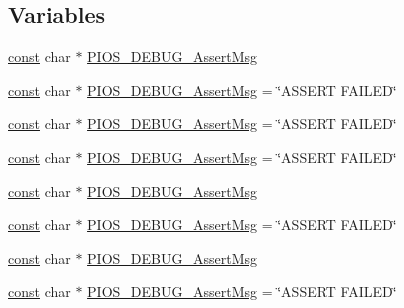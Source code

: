 \subsection*{Variables}
\begin{DoxyCompactItemize}
\item 
\hyperlink{group___n_a_m_e_ga7ae6d0e43244213b34de2c2b9aa30da6}{const} char $\ast$ \hyperlink{group___p_i_o_s___d_e_b_u_g_gaede09e7ce20c100871607d36904bea37}{P\-I\-O\-S\-\_\-\-D\-E\-B\-U\-G\-\_\-\-Assert\-Msg}
\item 
\hyperlink{group___n_a_m_e_ga7ae6d0e43244213b34de2c2b9aa30da6}{const} char $\ast$ \hyperlink{group___p_i_o_s___d_e_b_u_g_gaede09e7ce20c100871607d36904bea37}{P\-I\-O\-S\-\_\-\-D\-E\-B\-U\-G\-\_\-\-Assert\-Msg} = \char`\"{}A\-S\-S\-E\-R\-T F\-A\-I\-L\-E\-D\char`\"{}
\item 
\hyperlink{group___n_a_m_e_ga7ae6d0e43244213b34de2c2b9aa30da6}{const} char $\ast$ \hyperlink{group___p_i_o_s___d_e_b_u_g_gaede09e7ce20c100871607d36904bea37}{P\-I\-O\-S\-\_\-\-D\-E\-B\-U\-G\-\_\-\-Assert\-Msg} = \char`\"{}A\-S\-S\-E\-R\-T F\-A\-I\-L\-E\-D\char`\"{}
\item 
\hyperlink{group___n_a_m_e_ga7ae6d0e43244213b34de2c2b9aa30da6}{const} char $\ast$ \hyperlink{group___p_i_o_s___d_e_b_u_g_gaede09e7ce20c100871607d36904bea37}{P\-I\-O\-S\-\_\-\-D\-E\-B\-U\-G\-\_\-\-Assert\-Msg} = \char`\"{}A\-S\-S\-E\-R\-T F\-A\-I\-L\-E\-D\char`\"{}
\item 
\hyperlink{group___n_a_m_e_ga7ae6d0e43244213b34de2c2b9aa30da6}{const} char $\ast$ \hyperlink{group___p_i_o_s___d_e_b_u_g_gaede09e7ce20c100871607d36904bea37}{P\-I\-O\-S\-\_\-\-D\-E\-B\-U\-G\-\_\-\-Assert\-Msg}
\item 
\hyperlink{group___n_a_m_e_ga7ae6d0e43244213b34de2c2b9aa30da6}{const} char $\ast$ \hyperlink{group___p_i_o_s___d_e_b_u_g_gaede09e7ce20c100871607d36904bea37}{P\-I\-O\-S\-\_\-\-D\-E\-B\-U\-G\-\_\-\-Assert\-Msg} = \char`\"{}A\-S\-S\-E\-R\-T F\-A\-I\-L\-E\-D\char`\"{}
\item 
\hyperlink{group___n_a_m_e_ga7ae6d0e43244213b34de2c2b9aa30da6}{const} char $\ast$ \hyperlink{group___p_i_o_s___d_e_b_u_g_gaede09e7ce20c100871607d36904bea37}{P\-I\-O\-S\-\_\-\-D\-E\-B\-U\-G\-\_\-\-Assert\-Msg}
\item 
\hyperlink{group___n_a_m_e_ga7ae6d0e43244213b34de2c2b9aa30da6}{const} char $\ast$ \hyperlink{group___p_i_o_s___d_e_b_u_g_gaede09e7ce20c100871607d36904bea37}{P\-I\-O\-S\-\_\-\-D\-E\-B\-U\-G\-\_\-\-Assert\-Msg} = \char`\"{}A\-S\-S\-E\-R\-T F\-A\-I\-L\-E\-D\char`\"{}
\end{DoxyCompactItemize}


